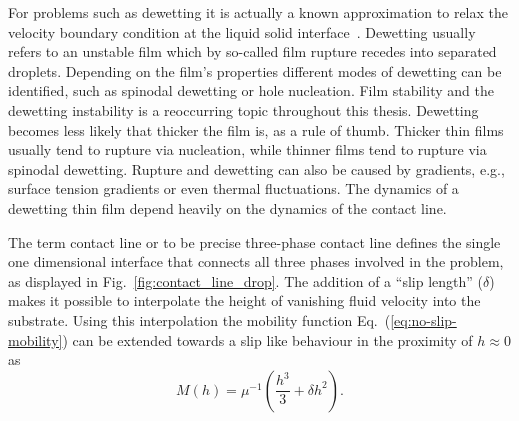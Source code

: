 For problems such as dewetting it is actually a known approximation to relax the velocity boundary condition at the liquid solid interface~\cite{munchDewettingRatesThin2005, munchLubricationModelsSmall2005, fetzerNewSlipRegimes2005}.
Dewetting usually refers to an unstable film which by so-called film rupture recedes into separated droplets. 
Depending on the film's properties different modes of dewetting can be identified, such as spinodal dewetting or hole nucleation.
Film stability and the dewetting instability is a reoccurring topic throughout this thesis. 
Dewetting becomes less likely that thicker the film is, as a rule of thumb.
Thicker thin films usually tend to rupture via nucleation, while thinner films tend to rupture via spinodal dewetting.
Rupture and dewetting can also be caused by gradients, e.g., surface tension gradients or even thermal fluctuations.
The dynamics of a dewetting thin film depend heavily on the dynamics of the contact line. 

The term contact line or to be precise three-phase contact line defines the single one dimensional interface that connects all three phases involved in the problem, as displayed in Fig.~\ref{fig:contact_line_drop}.
The addition of a ``slip length'' ($\delta$) makes it possible to interpolate the height of vanishing fluid velocity into the substrate.
Using this interpolation the mobility function Eq.~(\ref{eq:no-slip-mobility}) can be extended towards a slip like behaviour in the proximity of $h\approx 0$ as
\begin{equation}\label{eq:slip_mobility}
    M(h) = \mu^{-1}\left(\frac{h^3}{3} + \delta h^2\right).
\end{equation}

